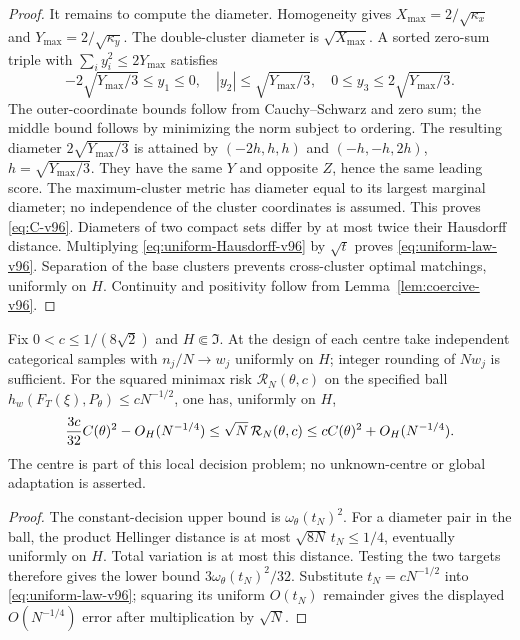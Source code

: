 \begin{proof}
It remains to compute the diameter. Homogeneity gives
$X_{\max}=2/\sqrt{\kappa_x}$ and
$Y_{\max}=2/\sqrt{\kappa_y}$. The double-cluster diameter is
$\sqrt{X_{\max}}$. A sorted zero-sum triple with
$\sum_i y_i^2\le2Y_{\max}$ satisfies
\[
 -2\sqrt{Y_{\max}/3}\le y_1\le0,\quad
 |y_2|\le\sqrt{Y_{\max}/3},\quad
 0\le y_3\le2\sqrt{Y_{\max}/3}.
\]
The outer-coordinate bounds follow from Cauchy--Schwarz and zero sum;
the middle bound follows by minimizing the norm subject to ordering.
The resulting diameter $2\sqrt{Y_{\max}/3}$ is attained by
$(-2h,h,h)$ and $(-h,-h,2h)$, $h=\sqrt{Y_{\max}/3}$.
They have the same $Y$ and opposite $Z$, hence the same leading score.
The maximum-cluster metric has diameter equal to its largest marginal
diameter; no independence of the cluster coordinates is assumed.
This proves \eqref{eq:C-v96}. Diameters of two compact sets differ
by at most twice their Hausdorff distance. Multiplying
\eqref{eq:uniform-Hausdorff-v96} by $\sqrt t$ proves
\eqref{eq:uniform-law-v96}. Separation of the base clusters prevents
cross-cluster optimal matchings, uniformly on $H$. Continuity and
positivity follow from Lemma~\ref{lem:coercive-v96}.
\end{proof}

\begin{corollary}
\label{cor:uniform-risk-v96}
Fix $0<c\le1/(8\sqrt2)$ and $H\Subset\mathfrak I$. At the design of
each centre take independent categorical samples with $n_j/N\to w_j$
uniformly on $H$; integer rounding of $Nw_j$ is sufficient. For the
squared minimax risk $\mathcal R_N(\theta,c)$ on the specified ball
$h_w(F_T(\xi),P_\theta)\le cN^{-1/2}$, one has, uniformly on $H$,
\[
 {3c\over32}C(\theta)^2-O_H(N^{-1/4})
 \le\sqrt N\,\mathcal R_N(\theta,c)
 \le cC(\theta)^2+O_H(N^{-1/4}).
\]
The centre is part of this local decision problem; no unknown-centre
or global adaptation is asserted.
\end{corollary}
\begin{proof}
The constant-decision upper bound is $\omega_\theta(t_N)^2$.
For a diameter pair in the ball, the product Hellinger distance is at
most $\sqrt{8N}\,t_N\le1/4$, eventually uniformly on $H$.
Total variation is at most this distance. Testing the two targets
therefore gives the lower bound $3\omega_\theta(t_N)^2/32$.
Substitute $t_N=cN^{-1/2}$ into \eqref{eq:uniform-law-v96}; squaring
its uniform $O(t_N)$ remainder gives the displayed $O(N^{-1/4})$
error after multiplication by $\sqrt N$.
\end{proof}
